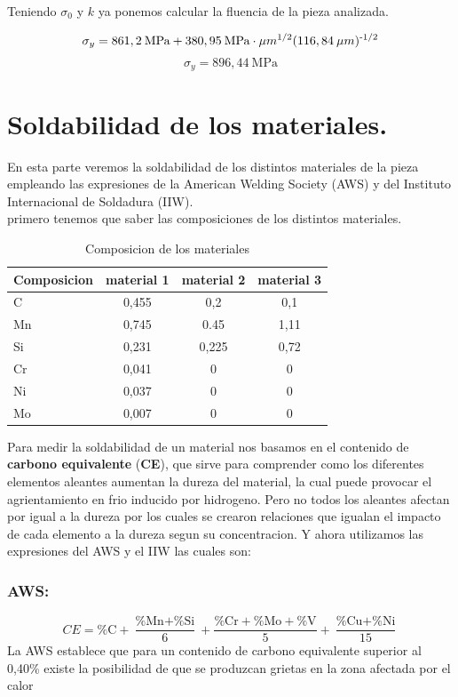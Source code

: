 \documentclass[12pt,a4paper]{article}
\begin{document}
Teniendo $\sigma_0$ y $k$ ya ponemos calcular la fluencia de la pieza analizada.

\begin{equation}
    \sigma_y = 861,2\: \text{MPa} + 380,95\: \text{MPa}\cdot \mu m\textsuperscript{1/2} (116,84\: \mu m)\textsuperscript{-1/2}
\end{equation}
\begin{equation}
    \sigma_y = 896,44\: \text{MPa} 
\end{equation}

\section{Soldabilidad de los materiales.}
En esta parte veremos la soldabilidad de los distintos materiales de la pieza empleando las expresiones de la American Welding Society
(AWS) y del Instituto Internacional de Soldadura (IIW).\\
primero tenemos que saber las composiciones de los distintos materiales.
\begin{table}[h]
    \centering
    \caption{Composicion de los materiales}
    \begin{tabular}{l|c|c|c}
        \hline
        Composicion & material 1 & material 2 & material 3\\
        \hline
        C & 0,455 & 0,2 & 0,1\\
        Mn & 0,745 & 0.45 & 1,11\\
        Si & 0,231 & 0,225 & 0,72\\
        Cr & 0,041 & 0 & 0\\
        Ni & 0,037 & 0 & 0\\
        Mo & 0,007 & 0 & 0\\
        \hline
    \end{tabular}
\end{table}
Para medir la soldabilidad de un material nos basamos en el contenido de \textbf{carbono equivalente} (\textbf{CE}), que sirve para comprender como los diferentes elementos aleantes aumentan la dureza del material, la cual puede provocar el agrientamiento en frio inducido por hidrogeno.
Pero no todos los aleantes afectan por igual a la dureza por los cuales se crearon relaciones que igualan el impacto de cada elemento a la dureza segun su concentracion.
Y ahora utilizamos las expresiones del AWS y el IIW las cuales son:\\
\subsubsection{AWS:}
\begin{equation*}
    CE = \text{\%C} + \frac{\text{\%Mn}+\text{\%Si}}{6} + \frac{\text{\%Cr}+\text{\%Mo}+\text{\%V}}{5} + \frac{\text{\%Cu}+\text{\%Ni}}{15}
\end{equation*}
La AWS establece que para un contenido de carbono equivalente superior al 0,40\% existe la posibilidad de que se produzcan grietas en la zona afectada por el calor 
\end{document}

